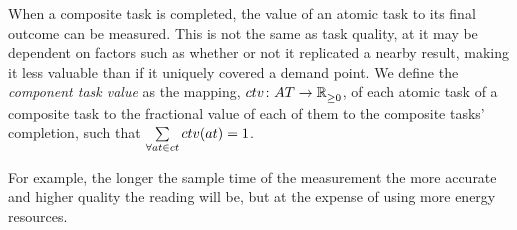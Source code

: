 When a composite task is completed, the value of an atomic task to its final outcome can be measured. This is not the same as task quality, at it may be dependent on factors such as whether or not it replicated a nearby result, making it less valuable than if it uniquely covered a demand point. We define the \textit{component task value} as the mapping, $\formalComponentTaskValue{}{}$,  of each atomic task of a composite task to the fractional value of each of them to the composite tasks' completion, such that $\sum\limits_{\forall \varAtomicTask{}{} \in \varCompositeTask{}{}} \functionComponentTaskValue{}{} = 1$.

For example, the longer the sample time of the measurement the more accurate and higher quality the reading will be, but at the expense of using more energy resources. 
